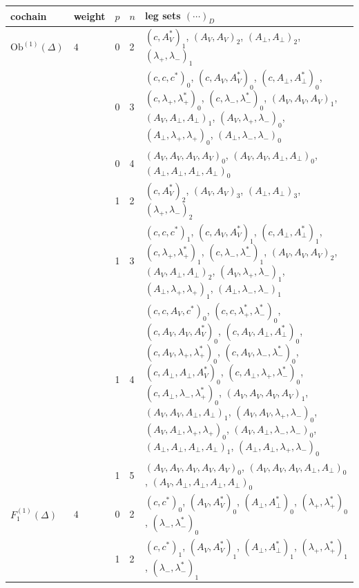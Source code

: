 \documentclass[11pt]{article}
\numberwithin{equation}{section}
\theoremstyle{plain}
\theoremstyle{definition}
\newcommand{\Ob}{\mathrm{Ob}}
\begin{document}
{\footnotesize
\begin{longtable}{>{\raggedright}p{2.3cm}|p{0.6cm}|p{0.25cm}|p{0.25cm}|>{\raggedright\arraybackslash}p{11.6cm}}
cochain & weight & $p$ & $n$ & leg sets $(\cdots)_D$\\
\hline
\endhead
$\Ob^{(1)}(\Delta)$ & $4$ & 0 & 2 & $(c,A^*_V)_{1}$, $(A_V,A_V)_{2}$, $(A_\perp,A_\perp)_{2}$, $(\lambda_+,\lambda_-)_{1}$ \\
 &  & 0 & 3 & $(c,c,c^*)_{0}$, $(c,A_V,A^*_V)_{0}$, $(c,A_\perp,A^*_\perp)_{0}$, $(c,\lambda_+,\lambda^*_+)_{0}$, $(c,\lambda_-,\lambda^*_-)_{0}$, $(A_V,A_V,A_V)_{1}$, $(A_V,A_\perp,A_\perp)_{1}$, $(A_V,\lambda_+,\lambda_-)_{0}$, $(A_\perp,\lambda_+,\lambda_+)_{0}$, $(A_\perp,\lambda_-,\lambda_-)_{0}$ \\
 &  & 0 & 4 & $(A_V,A_V,A_V,A_V)_{0}$, $(A_V,A_V,A_\perp,A_\perp)_{0}$, $(A_\perp,A_\perp,A_\perp,A_\perp)_{0}$ \\
 &  & 1 & 2 & $(c,A^*_V)_{2}$, $(A_V,A_V)_{3}$, $(A_\perp,A_\perp)_{3}$, $(\lambda_+,\lambda_-)_{2}$ \\
 &  & 1 & 3 & $(c,c,c^*)_{1}$, $(c,A_V,A^*_V)_{1}$, $(c,A_\perp,A^*_\perp)_{1}$, $(c,\lambda_+,\lambda^*_+)_{1}$, $(c,\lambda_-,\lambda^*_-)_{1}$, $(A_V,A_V,A_V)_{2}$, $(A_V,A_\perp,A_\perp)_{2}$, $(A_V,\lambda_+,\lambda_-)_{1}$, $(A_\perp,\lambda_+,\lambda_+)_{1}$, $(A_\perp,\lambda_-,\lambda_-)_{1}$ \\
 &  & 1 & 4 & $(c,c,A_V,c^*)_{0}$, $(c,c,\lambda^*_+,\lambda^*_-)_{0}$, $(c,A_V,A_V,A^*_V)_{0}$, $(c,A_V,A_\perp,A^*_\perp)_{0}$, $(c,A_V,\lambda_+,\lambda^*_+)_{0}$, $(c,A_V,\lambda_-,\lambda^*_-)_{0}$, $(c,A_\perp,A_\perp,A^*_V)_{0}$, $(c,A_\perp,\lambda_+,\lambda^*_-)_{0}$, $(c,A_\perp,\lambda_-,\lambda^*_+)_{0}$, $(A_V,A_V,A_V,A_V)_{1}$, $(A_V,A_V,A_\perp,A_\perp)_{1}$, $(A_V,A_V,\lambda_+,\lambda_-)_{0}$, $(A_V,A_\perp,\lambda_+,\lambda_+)_{0}$, $(A_V,A_\perp,\lambda_-,\lambda_-)_{0}$, $(A_\perp,A_\perp,A_\perp,A_\perp)_{1}$, $(A_\perp,A_\perp,\lambda_+,\lambda_-)_{0}$ \\
 &  & 1 & 5 & $(A_V,A_V,A_V,A_V,A_V)_{0}$, $(A_V,A_V,A_V,A_\perp,A_\perp)_{0}$, $(A_V,A_\perp,A_\perp,A_\perp,A_\perp)_{0}$ \\
\hline
$F_1^{(1)}(\Delta)$ & $4$ & 0 & 2 & $(c,c^*)_{0}$, $(A_V,A^*_V)_{0}$, $(A_\perp,A^*_\perp)_{0}$, $(\lambda_+,\lambda^*_+)_{0}$, $(\lambda_-,\lambda^*_-)_{0}$ \\
 &  & 1 & 2 & $(c,c^*)_{1}$, $(A_V,A^*_V)_{1}$, $(A_\perp,A^*_\perp)_{1}$, $(\lambda_+,\lambda^*_+)_{1}$, $(\lambda_-,\lambda^*_-)_{1}$ \\

\end{longtable}}
\end{document}
